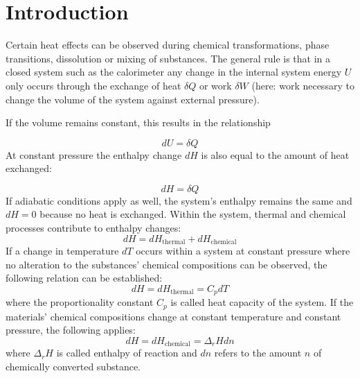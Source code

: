 
\section{Introduction}


Certain heat effects can be observed during chemical transformations, phase transitions, dissolution or mixing of substances. 
The general rule is that in a closed system such as the calorimeter any change in the internal system energy $U$ only occurs through the exchange of heat $\delta Q$ or work $\delta W$ (here: work necessary to change the volume of the system against external pressure). 

If the volume remains constant, this results in the relationship 

\begin{equation} \label{eq:1} %
    dU = \delta Q
\end{equation} 
At constant pressure the enthalpy change $dH$  is also equal to the amount of heat exchanged: 

\begin{equation} \label{eq:2} %
    dH = \delta Q
\end{equation} 
If adiabatic conditions apply as well, the system's enthalpy remains the same and $dH = 0$ because no heat is exchanged. Within the system, thermal and chemical processes contribute to enthalpy changes:
\begin{equation} \label{eq:3} %
    dH = dH_{\mathrm{thermal}} + dH_{\mathrm{chemical}}
\end{equation}
If a change in temperature  $dT$  occurs within a system at constant pressure where no alteration to the substances' chemical compositions can be observed, the following relation can be established:
\begin{equation} \label{eq:4} %
    dH = dH_{\mathrm{thermal}} = C_p dT
\end{equation}
where the proportionality constant $C_p$ is called heat capacity of the system. 
If the materials' chemical compositions change at constant temperature and constant pressure, the following applies: 
\begin{equation} \label{eq:5} %
    dH = dH_{\mathrm{chemical}} = \Delta _rH dn
\end{equation}
where $\Delta _rH$ is called enthalpy of reaction and $dn$ refers to the amount $n$ of chemically converted substance.


